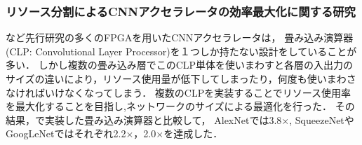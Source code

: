 {\subsubsection{リソース分割によるCNNアクセラレータの効率最大化に関する研究\cite{max}}
\cite{optimized}など先行研究の多くのFPGAを用いたCNNアクセラレータは，
畳み込み演算器(CLP: Convolutional Layer Processor)を１つしか持たない設計をしていることが多い．
しかし複数の畳み込み層でこのCLP単体を使いまわすと各層の入出力のサイズの違いにより，リソース使用量が低下してしまったり，何度も使いまわさなければいけなくなってしまう．
複数のCLPを実装することでリソース使用率を最大化することを目指し,ネットワークのサイズによる最適化を行った．
その結果，\cite{optimized}で実装した畳み込み演算器と比較して，
AlexNet\cite{alexnet}では3.8$\times$, SqueezeNet\cite{squeezenet}やGoogLeNet\cite{googlenet}ではそれぞれ2.2$\times$，2.0$\times$を達成した．
}